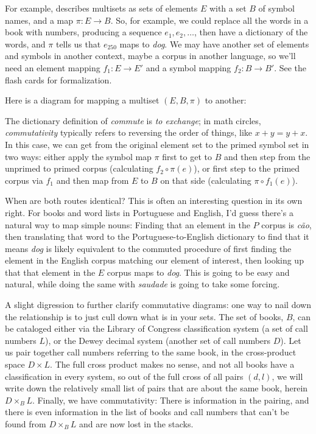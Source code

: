 \documentclass[11pt]{article}
\begin{document}
For example,
\citet{spivak:category} describes multisets as sets of elements $E$ with a set $B$ of
symbol names, and a map $\pi:E\to B$. So, for example, we could replace all the words in a
book with numbers, producing a sequence $e_1, e_2, \dots$, then have a dictionary
of the words, and $\pi$ tells us that $e_{250}$ maps to {\em dog}. We
may have another set of elements and symbols in another context, maybe a corpus in
another language, so we'll need an element mapping $f_1:E\to E'$ and a symbol mapping
$f_2:B\to B'$. See the flash cards for formalization.

Here is a diagram for mapping a multiset $(E, B, \pi)$ to another:

The dictionary definition of {\em
commute} is {\em to exchange}; in math circles, {\em commutativity} typically refers to
reversing the order of things, like $x+y = y+x$. In this case, we can 
get from the original element set to the primed symbol set in two ways:
either apply the symbol map $\pi$ first to get to $B$ and then step from the unprimed to
primed corpus (calculating $f_2\circ\pi(e)$), or first step to the primed corpus via $f_1$ and then
map from $E$ to $B$ on that side (calculating $\pi\circ f_1(e)$).

When are both routes identical? This is often an interesting question in its own right.
For books and word lists in Portuguese and English, I'd guess there's a natural
way to map simple nouns: Finding that an element in the $P$ corpus is {\em cão},
then translating that word to the Portuguese-to-English dictionary to find that it means {\em dog}
is likely equivalent to the commuted procedure of first finding the element in the
English corpus matching our element of interest, then looking up that that element in
the $E$ corpus maps to {\em dog}. This is going to be easy and natural, while doing
the same with {\em saudade} is going to take some forcing.

A slight digression to further clarify commutative diagrams:
one way to nail down the relationship is to just cull down what is in your sets. The set
of books, $B$, can be cataloged either via the Library of Congress classification system
(a set of call numbers $L$), or the Dewey decimal system (another set of call numbers
$D$). Let us pair together call numbers referring to the same book, in the cross-product
space $D\times L$. The full cross product makes no sense, and
not all books have a classification in every system, so
out of the full cross of all pairs $(d, l)$,
we will write down the relatively small list of pairs that are about the same book, herein $D\times_B L$.
Finally, we have commutativity:
There is information in the pairing, and there is even information in the list of books
and call numbers that can't be found from $D\times_B L$ and are now lost in the stacks.
\end{document}
